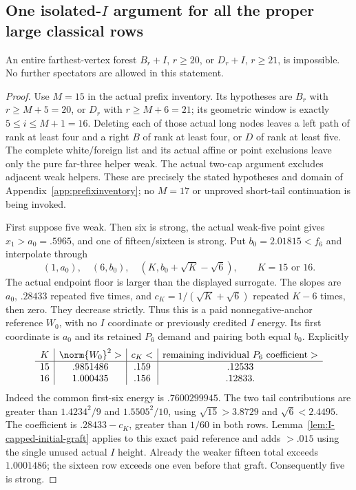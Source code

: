 \subsection{One isolated-$I$ argument for all the proper large classical rows}
\label{app:tail:classicalI}
\begin{proposition}
\label{app:tail:prop:classicalI}
An entire farthest-vertex forest $B_r+I$, $r\ge20$, or $D_r+I$,
$r\ge21$, is impossible. No further spectators are allowed in this
statement.
\end{proposition}
\begin{proof}
Use $M=15$ in the actual prefix inventory. Its hypotheses are
$B_r$ with $r\ge M+5=20$, or $D_r$ with $r\ge M+6=21$;
its geometric window is exactly $5\le i\le M+1=16$.
Deleting each of those actual long nodes leaves a left path of
rank at least four and a right $B$ of rank at least four, or $D$
of rank at least five. The complete white/foreign list and its
actual affine or point exclusions leave only the pure far-three
helper weak. The actual two-cap argument excludes adjacent weak
helpers. These are precisely the stated hypotheses and domain of
Appendix~\ref{app:prefixinventory}; no $M=17$ or unproved short-tail
continuation is being invoked.

First suppose five weak. Then six is strong, the actual weak-five
point gives $x_1>a_0=.5965$, and one of fifteen/sixteen is strong.
Put $b_0=2.01815<f_6$ and interpolate through
\[
 (1,a_0),\quad(6,b_0),\quad
 (K,b_0+\sqrt K-\sqrt6),\qquad K=15\text{ or }16.
\]
The actual endpoint floor is larger than the displayed surrogate.
The slopes are $a_0$, $.28433$ repeated five times, and
$c_K=1/(\sqrt K+\sqrt6)$ repeated $K-6$ times, then zero.
They decrease strictly. Thus this is a paid nonnegative-anchor
reference $W_0$, with no $I$ coordinate or previously credited
$I$ energy. Its first coordinate is $a_0$ and its retained
$P_6$ demand and pairing both equal $b_0$. Explicitly
\[
\begin{array}{c|c|c|c}
K&\norm{W_0}^2>&c_K<&
 \text{remaining individual }P_6\text{ coefficient}>\\\hline
15&.9851486&.159&.12533\\
16&1.000435&.156&.12833 .
\end{array}
\]
Indeed the common first-six energy is $.7600299945$.
The two tail contributions are greater than $1.4234^2/9$ and
$1.5505^2/10$, using $\sqrt{15}>3.8729$ and $\sqrt6<2.4495$.
The coefficient is $.28433-c_K$, greater than $1/60$ in both rows.
Lemma~\ref{lem:I-capped-initial-graft} applies to this exact paid
reference and adds $>.015$ using the single unused actual $I$ height.
Already the weaker fifteen total exceeds $1.0001486$; the sixteen
row exceeds one even before that graft. Consequently five is strong.


\end{proof}
